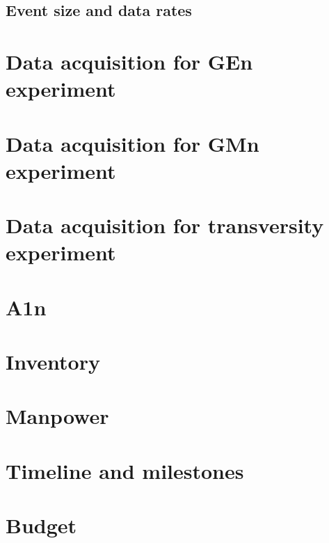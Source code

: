 \documentclass{article}
\begin{document}
\subsection{Event size and data rates}
\section{Data acquisition for GEn experiment}

\section{Data acquisition for GMn experiment}


\section{Data acquisition for transversity experiment}

\section{A1n}

\section{Inventory}

\section{Manpower}

\section{Timeline and milestones}

\section{Budget}
\end{document}
